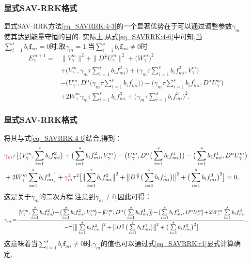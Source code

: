 \documentclass[aspectratio=169]{beamer}
\numberwithin{theorem}{section} %
\numberwithin{equation}{section}%
\numberwithin{figure}{section}%
\numberwithin{table}{section}%
\begin{document}
\begin{frame}\frametitle{显式SAV-RRK格式}

	
显式SAV-RRK方法\eqref{eq_SAVRRK:4-3}的一个显著优势在于可以通过调整参数$\gamma_m$ 使其达到能量守恒的目的.
实际上,从式\eqref{eq_SAVRRK:4-6}中可知,当$\sum\limits_{i=1}^s b_i \bm{f}_{m i}=0$时,取$\gamma_m=1$.当$\sum\limits_{i=1}^s b_i \bm{f}_{m i}\neq 0$时
	\begin{align}
	E_{\gamma}^{m+1}  = & \|V_{\gamma}^{m}\|^2+\|D^\frac{\alpha}{2} U_{\gamma}^{m}\|^2+\big(W_{\gamma}^{m}\big)^2 \nonumber\\
	& + \big(V_{\gamma}^{m},\gamma_m\tau\sum\limits_{i=1}^{s}b_if_{mi}^2\big)+\big(\gamma_m\tau\sum\limits_{i=1}^{s}b_if_{mi}^2,V_{\gamma}^{m}\big)\nonumber\\
	&-\big(U_{\gamma}^{m}, D^{\alpha}\big(\gamma_m\tau\sum\limits_{i=1}^{s}b_if_{mi}^1\big)\big)-\big(\gamma_m\tau\sum\limits_{i=1}^{s}b_if_{mi}^1, D^{\alpha} U_{\gamma}^{m}\big)\nonumber\\
	&+2W_{\gamma}^{m}\gamma_m\tau\sum\limits_{i=1}^{s}b_if_{mi}^3+\big(\gamma_m\tau\sum\limits_{i=1}^{s}b_if_{mi}^3\big)^2.\label{eq_SAVRRK:49}
	\end{align}
		
\end{frame}

\begin{frame}\frametitle{显式SAV-RRK格式}
\noindent 将其与式\eqref{eq_SAVRRK:4-6}结合,得到：
	\begin{align*}
	&{\color{purple}\gamma_m}\tau\big[\big(V_{\gamma}^{m},\sum\limits_{i=1}^{s}b_if_{mi}^2\big)+\big(\sum\limits_{i=1}^{s}b_if_{mi}^2,V_{\gamma}^{m}\big)-\big(U_{\gamma}^{m},D^{\alpha}\big(\sum\limits_{i=1}^{s}b_if_{mi}^1\big)\big)-\big(\sum\limits_{i=1}^{s}b_if_{mi}^1, D^{\alpha} U_{\gamma}^{m}\big)\\
	&+2W_{\gamma}^{m}\sum\limits_{i=1}^{s}b_if_{mi}^3\big] +{\color{purple}\gamma_m^2}\tau^2\big[\big\|\sum\limits_{i=1}^{s}b_if_{mi}^2\big\|^2+ \big\|D^\frac{\alpha}{2}\big(\sum\limits_{i=1}^{s}b_if_{mi}^1\big)\big\|^2+\big(\sum\limits_{i=1}^{s}b_if_{mi}^3\big)^2\big]=0,
	\end{align*}
	这是关于$\gamma_m$的二次方程.注意到$\gamma_m\neq 0$,因此可得：
	\begin{equation}\label{eq_SAVRRK:r1}\small
	\gamma_m \!=\! \frac{\big(\!V_{\gamma}^{m},\sum\limits_{i=1}^{s}b_if_{mi}^2\!\big)\!+\!\big(\!\sum\limits_{i=1}^{s}b_if_{mi}^2,V_{\gamma}^{m}\!\big)\!-\!\big(\!U_{\gamma}^{m},D^{\alpha}\big(\sum\limits_{i=1}^{s}b_if_{mi}^1\big)\!\big)\!-\!\big(\!\sum\limits_{i=1}^{s}b_if_{mi}^1, D^{\alpha} U_{\gamma}^{m}\!\big)\!+\!2W_{\gamma}^{m}\sum\limits_{i=1}^{s}b_if_{mi}^3}{-\tau\big[\big\|\sum\limits_{i=1}^{s}b_if_{mi}^2\big\|^2+\big\|D^\frac{\alpha}{2}\big(\sum\limits_{i=1}^{s}b_if_{mi}^1\big)\big\|^2+\big(\sum\limits_{i=1}^{s}b_if_{mi}^3\big)^2\big]} .
	\end{equation}
	这意味着当$\sum\limits_{i=1}^s b_i \bm{f}_{m i}\neq 0$时,{\color{purple}$\gamma_m$的值也可以通过式\eqref{eq_SAVRRK:r1}显式计算确定.}

\end{frame}
\end{document}
